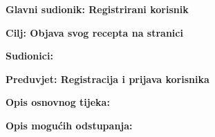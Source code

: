 \noindent {}
\begin{packed_item}

	\item \textbf{Glavni sudionik: Registrirani korisnik }
	\item  \textbf{Cilj: Objava svog recepta na stranici}
	\item  \textbf{Sudionici:}
	\item  \textbf{Preduvjet: Registracija i prijava korisnika}
	\item  \textbf{Opis osnovnog tijeka:}

	\item[] \begin{packed_enum}

		\item
		\item
		\item
		\item
		\item
	\end{packed_enum}

	\item  \textbf{Opis mogućih odstupanja:}

	\item[] \begin{packed_item}

		\item[2.a]
		\item[] \begin{packed_enum}

			\item
			\item

		\end{packed_enum}
		\item[2.b]
		\item[3.a]

	\end{packed_item}
\end{packed_item}

